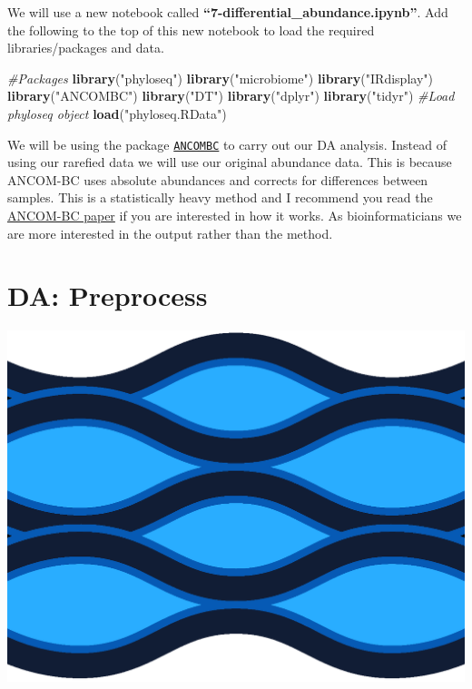 \documentclass[
]{book}
\newenvironment{Shaded}{\begin{snugshade}}{\end{snugshade}}
\newcommand{\CommentTok}[1]{\textcolor[rgb]{0.56,0.35,0.01}{\textit{#1}}}
\newcommand{\FunctionTok}[1]{\textcolor[rgb]{0.13,0.29,0.53}{\textbf{#1}}}
\newcommand{\NormalTok}[1]{#1}
\newcommand{\StringTok}[1]{\textcolor[rgb]{0.31,0.60,0.02}{#1}}
\begin{document}
We will use a new notebook called \textbf{``7-differential\_abundance.ipynb''}.
Add the following to the top of this new notebook to load the required libraries/packages and data.

\begin{Shaded}
\begin{Highlighting}[]
\CommentTok{\#Packages}
\FunctionTok{library}\NormalTok{(}\StringTok{"phyloseq"}\NormalTok{)}
\FunctionTok{library}\NormalTok{(}\StringTok{"microbiome"}\NormalTok{)}
\FunctionTok{library}\NormalTok{(}\StringTok{"IRdisplay"}\NormalTok{)}
\FunctionTok{library}\NormalTok{(}\StringTok{"ANCOMBC"}\NormalTok{)}
\FunctionTok{library}\NormalTok{(}\StringTok{"DT"}\NormalTok{)}
\FunctionTok{library}\NormalTok{(}\StringTok{"dplyr"}\NormalTok{)}
\FunctionTok{library}\NormalTok{(}\StringTok{"tidyr"}\NormalTok{)}
\CommentTok{\#Load phyloseq object}
\FunctionTok{load}\NormalTok{(}\StringTok{"phyloseq.RData"}\NormalTok{)}
\end{Highlighting}
\end{Shaded}

We will be using the package \href{https://github.com/FrederickHuangLin/ANCOM-BC-Code-Archive}{\texttt{ANCOMBC}} to carry out our DA analysis.
Instead of using our rarefied data we will use our original abundance data.
This is because ANCOM-BC uses absolute abundances and corrects for differences between samples.
This is a statistically heavy method and I recommend you read the \href{https://www.nature.com/articles/s41467-020-17041-7}{ANCOM-BC paper} if you are interested in how it works.
As bioinformaticians we are more interested in the output rather than the method.

\hypertarget{da-preprocess}{%
\section{DA: Preprocess}\label{da-preprocess}}

\includegraphics{figures/water_surface.png}
\end{document}
